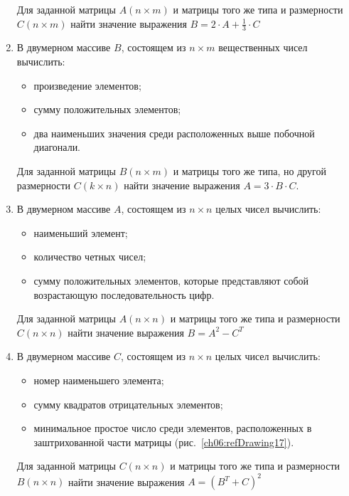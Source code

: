 \begin{enumerate}
Для заданной матрицы $A(n\times m)$ и матрицы того же типа и размерности
$C(n\times m)$ найти значение выражения  $B=2\cdot A+\frac{1}{3}\cdot C$  

\item В двумерном массиве $B$, состоящем из $n\times m$ вещественных чисел вычислить:
\begin{itemize}
\item произведение элементов;
\item сумму положительных элементов;
\item два наименьших значения среди расположенных выше побочной диагонали.
\end{itemize}

Для заданной матрицы $B(n\times m)$ и матрицы того же типа, но другой размерности  
$C(k\times n)$ найти значение выражения  $A=3\cdot B\cdot C$.

\item В двумерном массиве $A$, состоящем из $n\times n$ целых чисел вычислить: 
\begin{itemize}
\item наименьший элемент;
\item количество четных чисел;
\item сумму положительных элементов, которые представляют собой возрастающую последовательность цифр.
\end{itemize}

Для заданной матрицы $A(n\times n)$ и матрицы того же типа и размерности
$C(n\times n)$ найти значение выражения  $B=A^2-C^T$  

\item В двумерном массиве $C$, состоящем из $n\times n$ целых чисел вычислить:
\begin{itemize}
\item номер наименьшего элемента;
\item сумму квадратов отрицательных элементов;
\item минимальное простое число среди элементов, расположенных в заштрихованной 
части матрицы (рис.~\ref{ch06:refDrawing17}).
\end{itemize}

Для заданной матрицы $C(n\times n)$ и матрицы того же типа и размерности
$B(n\times n)$ найти значение выражения  $A=(B^T+C)^2$  


\end{enumerate}
